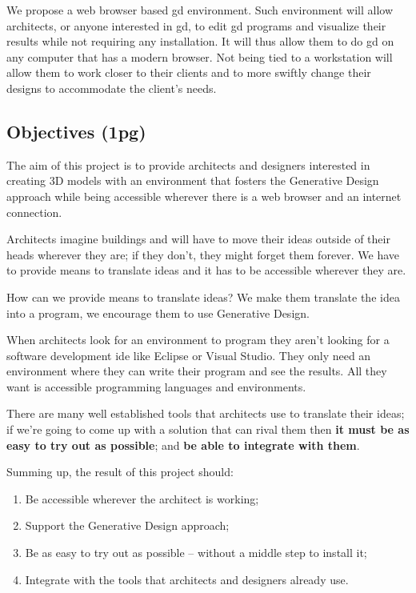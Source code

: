 \documentclass{./llncs2e/llncs}
\begin{document}
	We propose a web browser based \ac{gd} environment. 
	Such environment will allow architects, or anyone interested in \ac{gd}, to edit \ac{gd} programs and visualize their results while not requiring any installation. 
	It will thus allow them to do \ac{gd} on any computer that has a modern browser. 
	Not being tied to a workstation will allow them to work closer to their clients and to more swiftly change their designs to accommodate the client's needs.

\subsection{Objectives (1pg)}
	The aim of this project is to provide architects and designers interested in creating 3D models with an environment that fosters the Generative Design approach while being accessible wherever there is a web browser and an internet connection.

	Architects imagine buildings and will have to move their ideas outside of their heads wherever they are; if they don't, they might forget them forever. 
	We have to provide means to translate ideas and it has to be accessible wherever they are.

	How can we provide means to translate ideas? We make them translate the idea into a program, we encourage them to use Generative Design.

	When architects look for an environment to program they aren't looking for a software development \ac{ide} like Eclipse or Visual Studio. 
	They only need an environment where they can write their program and see the results. 
	All they want is accessible programming languages and environments.

	There are many well established tools that architects use to translate their ideas; 
	if we're going to come up with a solution that can rival them then \textbf{it must be as easy to try out as possible}; 
	and \textbf{be able to integrate with them}.

	Summing up, the result of this project should:
	\begin{enumerate}
		\item Be accessible wherever the architect is working; \label{obj:access}
		\item Support the Generative Design approach; \label{obj:gen-design}
		\item Be as easy to try out as possible -- without a middle step to install it; \label{obj:no-install}
		\item Integrate with the tools that architects and designers already use.\label{obj:inter-op}
	\end{enumerate}
\end{document}
